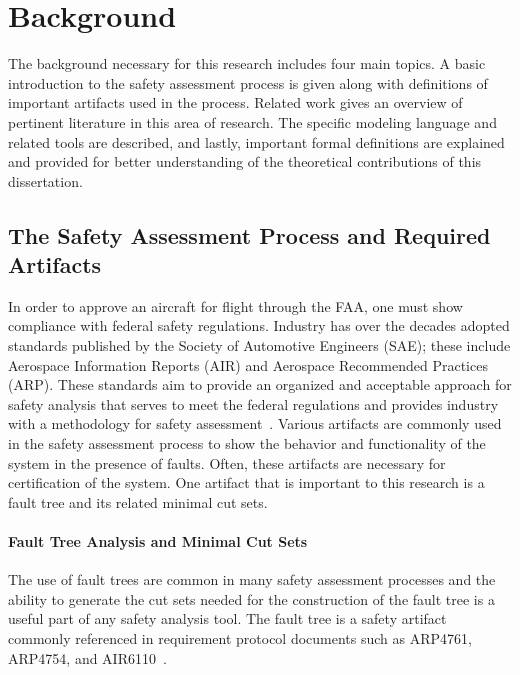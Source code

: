 \chapter{Background}
\label{chap:background}

The background necessary for this research includes four main topics. A basic introduction to the safety assessment process is given along with definitions of important artifacts used in the process. Related work gives an overview of pertinent literature in this area of research. The specific modeling language and related tools are described, and lastly, important formal definitions are explained and provided for better understanding of the theoretical contributions of this dissertation.

\section{The Safety Assessment Process and Required Artifacts}
In order to approve an aircraft for flight through the FAA, one must show compliance with federal safety regulations. Industry has over the decades adopted standards published by the Society of Automotive Engineers (SAE); these include Aerospace Information Reports (AIR) and Aerospace Recommended Practices (ARP). These standards aim to provide an organized and acceptable approach for safety analysis that serves to meet the federal regulations and provides industry with a methodology for safety assessment~\cite{FAA,SAE}. Various artifacts are commonly used in the safety assessment process to show the behavior and functionality of the system in the presence of faults. Often, these artifacts are necessary for certification of the system. One artifact that is important to this research is a fault tree and its related minimal cut sets.

\subsubsection{Fault Tree Analysis and Minimal Cut Sets}
The use of fault trees are common in many safety assessment processes and the ability to generate the cut sets needed for the construction of the fault tree is a useful part of any safety analysis tool. The fault tree is a safety artifact commonly referenced in requirement protocol documents such as ARP4761, ARP4754, and AIR6110~\cite{SAE:ARP4761,SAE:ARP4754A,AIR6110}.

